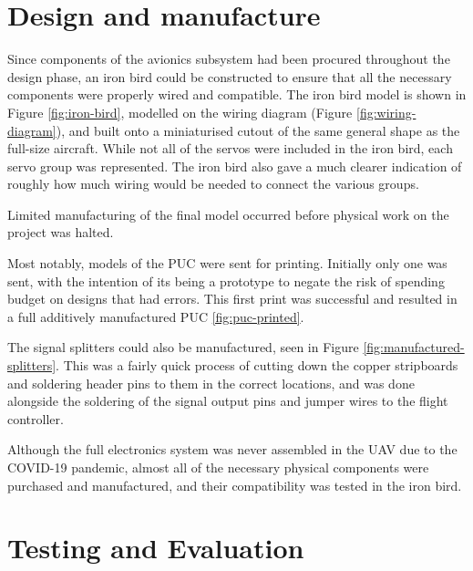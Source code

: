 \documentclass[../../main.tex]{subfiles}
\begin{document}

\section{Design and manufacture} \label{sec:project-review:design-and-manufacture}

Since components of the avionics subsystem had been procured throughout the design phase, an iron bird could be constructed to ensure that all the necessary components were properly wired and compatible.
The iron bird model is shown in Figure \ref{fig:iron-bird}, modelled on the wiring diagram (Figure \ref{fig:wiring-diagram}), and built onto a miniaturised cutout of the same general shape as the full-size aircraft.
While not all of the servos were included in the iron bird, each servo group was represented.
The iron bird also gave a much clearer indication of roughly how much wiring would be needed to connect the various groups.


Limited manufacturing of the final model occurred before physical work on the project was halted.

Most notably, models of the PUC were sent for printing.
Initially only one was sent, with the intention of its being a prototype to negate the risk of spending budget on designs that had errors.
This first print was successful and resulted in a full additively manufactured PUC \ref{fig:puc-printed}.


The signal splitters could also be manufactured, seen in Figure \ref{fig:manufactured-splitters}.
This was a fairly quick process of cutting down the copper stripboards and soldering header pins to them in the correct locations, and was done alongside the soldering of the signal output pins and jumper wires to the flight controller.


Although the full electronics system was never assembled in the UAV due to the COVID-19 pandemic, almost all of the necessary physical components were purchased and manufactured, and their compatibility was tested in the iron bird. 

\section{Testing and Evaluation} \label{sec:project-review:testing-and-evaluation}
\end{document}
